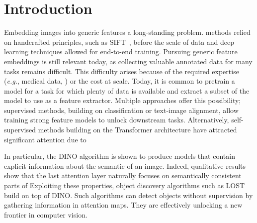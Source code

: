 \section{Introduction}
Embedding images into generic features  a long-standing problem. 
  methods relied on handcrafted principles, such as SIFT~\citep{lowe2004distinctive}, before the scale of data and deep learning techniques allowed for end-to-end training. 
Pursuing generic feature embeddings is still relevant today, as collecting valuable annotated data for many  tasks remains difficult.
This difficulty arises because of the required expertise (\emph{e.g.}, medical data, ) or the cost at scale. 
Today, it is common to pretrain a model for a task for which plenty of data is available and extract a subset of the model to use as a feature extractor. 
Multiple approaches offer this possibility; supervised methods, building on classification or text-image alignment, allow training strong feature models to unlock downstream tasks. 
Alternatively, self-supervised methods building on the Transformer architecture have attracted significant attention due to  

In particular, the DINO algorithm is shown to produce models that contain explicit information about the semantic  of an image.
Indeed, qualitative results show that the last attention layer naturally focuses on semantically consistent parts of  
Exploiting these properties, object discovery algorithms such as LOST \citep{simeoni2021localizing} build on top of DINO. 
Such algorithms can detect objects without supervision by gathering information in attention maps.
They are effectively unlocking a new frontier in computer vision. 

